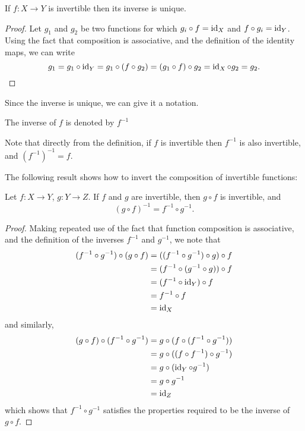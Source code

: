 \begin{proposition}
If $f:X \to Y$ is invertible then its inverse is unique.
\end{proposition}

\begin{proof}
Let $g_1$ and $g_2$ be two functions for which $g_i \circ f = \operatorname{id}_X$ and $f \circ g_i = \operatorname{id}_Y$. Using the fact that composition is associative, and the definition of the identity maps, we can write
\[ g_1 = g_1 \circ \operatorname{id}_Y = g_1 \circ (f \circ g_2) = (g_1 \circ f) \circ g_2 = \operatorname{id}_X \circ g_2 = g_2.\]
\end{proof}

Since the inverse is unique, we can give it a notation.

\begin{notation}
The inverse of $f$ is denoted by $f^{-1}$
\end{notation}

\begin{remark}
Note that directly from the definition, if $f$ is invertible then $f^{-1}$ is also invertible, and $(f^{-1})^{-1}=f$.
\end{remark}

The following result shows how to invert the composition of invertible functions:

\begin{proposition}
Let $f:X \to Y$, $g:Y \to Z$. If $f$ and $g$ are invertible, then $g \circ f$ is invertible, and
\[(g \circ f)^{-1}=f^{-1}\circ g^{-1}.\]
\end{proposition}

\begin{proof}
Making repeated use of the fact that function composition is associative, and the definition of the inverses $f^{-1}$ and $g^{-1}$, we note that
\begin{align*}
(f^{-1}\circ g^{-1}) \circ (g \circ f) 
&= ((f^{-1} \circ g^{-1}) \circ g) \circ f \\
&= (f^{-1} \circ (g^{-1} \circ g)) \circ f \\
&= (f^{-1} \circ \operatorname{id}_Y) \circ f \\
&= f^{-1} \circ f \\
&= \operatorname{id}_X
\end{align*}
and similarly,
\begin{align*}
(g \circ f) \circ (f^{-1} \circ g^{-1}) 
&= g \circ (f \circ (f^{-1} \circ g^{-1})) \\
&= g \circ ((f \circ f^{-1}) \circ g^{-1}) \\
&= g \circ (\operatorname{id}_Y \circ g^{-1}) \\
&= g \circ g^{-1} \\
&= \operatorname{id}_Z
\end{align*}
which shows that $f^{-1} \circ g^{-1}$ satisfies the properties required to be the inverse of $g \circ f$.
\end{proof}

